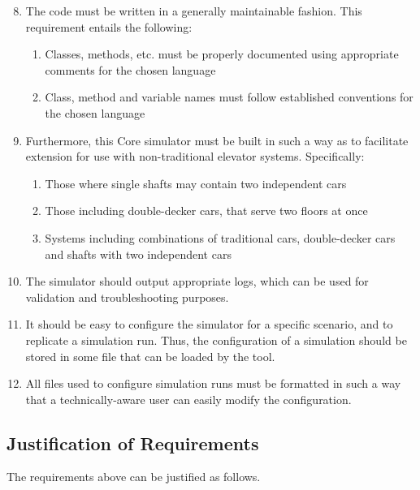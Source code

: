 \documentclass{UoYCSproject}
\begin{document}
	\begin{enumerate}
	\setcounter{enumi}{7}
		\item The code must be written in a generally maintainable fashion.  This requirement entails the following:
		\begin{enumerate}
			\item Classes, methods, etc. must be properly documented using appropriate comments for the chosen language
			\item Class, method and variable names must follow established conventions for the chosen language
		\end{enumerate}
		\item Furthermore, this Core simulator must be built in such a way as to facilitate extension for use with non-traditional elevator systems.  Specifically:
		\begin{enumerate}
			\item Those where single shafts may contain two independent cars
			\item Those including double-decker cars, that serve two floors at once
			\item Systems including combinations of traditional cars, double-decker cars and shafts with two independent cars
		\end{enumerate}
		\item The simulator should output appropriate logs, which can be used for validation and troubleshooting purposes.
		\item It should be easy to configure the simulator for a specific scenario, and to replicate a simulation run.  Thus, the configuration of a simulation should be stored in some file that can be loaded by the tool.
		\item All files used to configure simulation runs must be formatted in such a way that a technically-aware user can easily modify the configuration.

	\end{enumerate}

\subsection{Justification of Requirements}

The requirements above can be justified as follows.
\end{document}

